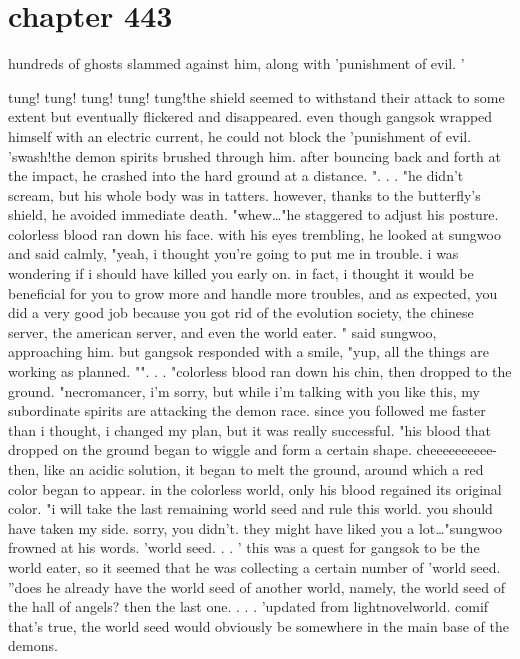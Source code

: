 \section{chapter 443}

hundreds of ghosts slammed against him, along with 'punishment of evil.
'




tung! tung! tung! tung! tung!the shield seemed to withstand their attack to some extent but eventually flickered and disappeared.
even though gangsok wrapped himself with an electric current, he could not block the 'punishment of evil.
'swash!the demon spirits brushed through him.
 after bouncing back and forth at the impact, he crashed into the hard ground at a distance.
".
.
.
"he didn't scream, but his whole body was in tatters.
 however, thanks to the butterfly's shield, he avoided immediate death.
"whew…"he staggered to adjust his posture.
 colorless blood ran down his face.
 with his eyes trembling, he looked at sungwoo and said calmly, "yeah, i thought you're going to put me in trouble.
 i was wondering if i should have killed you early on.
 in fact, i thought it would be beneficial for you to grow more and handle more troubles, and as expected, you did a very good job because you got rid of the evolution society, the chinese server, the american server, and even the world eater.
" said sungwoo, approaching him.
 but gangsok responded with a smile, "yup, all the things are working as planned.
"".
.
.
"colorless blood ran down his chin, then dropped to the ground.
"necromancer, i'm sorry, but while i'm talking with you like this, my subordinate spirits are attacking the demon race.
 since you followed me faster than i thought, i changed my plan, but it was really successful.
"his blood that dropped on the ground began to wiggle and form a certain shape.
cheeeeeeeeee-then, like an acidic solution, it began to melt the ground, around which a red color began to appear.
 in the colorless world, only his blood regained its original color.
"i will take the last remaining world seed and rule this world.
 you should have taken my side.
 sorry, you didn't.
 they might have liked you a lot…"sungwoo frowned at his words.
'world seed.
.
.
'
this was a quest for gangsok to be the world eater, so it seemed that he was collecting a certain number of 'world seed.
''does he already have the world seed of another world, namely, the world seed of the hall of angels? then the last one.
.
.
.
'updated from lightnovelworld.
comif that's true, the world seed would obviously be somewhere in the main base of the demons.
